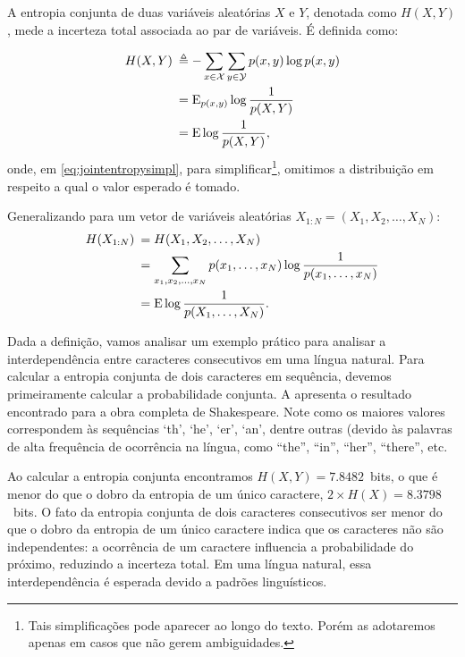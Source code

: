 A entropia conjunta de duas variáveis aleatórias $X$ e $Y$, denotada como $H(X,Y)$, 
mede a incerteza total associada ao par de variáveis. É definida como:
\begin{definition}
\begin{subequations}\label{eq:jointentropy}
\begin{align}    
H(X,Y) \: &\triangleq - \sum_{x \in \mathcal{X}} \sum_{y \in \mathcal{Y}} p(x,y) \log p(x,y) \\
	  &= \E_{p(x,y)} \log \frac{1}{p(X,Y)} \\
	  &= \E \log \frac{1}{p(X,Y)},\label{eq:jointentropysimpl}
\end{align}
\end{subequations}
onde, em \ref{eq:jointentropysimpl}, para simplificar\footnote{Tais simplificações pode
aparecer ao longo do texto. Porém as adotaremos apenas em casos que não gerem ambiguidades.}, 
omitimos a distribuição em respeito
a qual o valor esperado é tomado.
\end{definition}

Generalizando para um vetor de variáveis aleatórias $X_{1:N} = (X_1, X_2, \ldots, X_N)$:
\begin{subequations}\label{eq:entropiavetor}
\begin{align}
H(X_{1:N}) \: &= H(X_1, X_2, \ldots, X_N) \\
     &= \sum_{x_1, x_2, \ldots , x_N} p(x_1, \ldots, x_N) \log \frac{1}{p(x_1, \ldots, x_N)} \\
     &= \mathrm{E} \log \frac{1}{p(X_1, \ldots, X_N)} .
\end{align}
\end{subequations}

Dada a definição, vamos analisar um exemplo prático para analisar a
interdependência entre caracteres consecutivos em uma língua natural. Para
calcular a entropia conjunta de dois caracteres em sequência, devemos
primeiramente calcular a probabilidade conjunta. A
 apresenta o resultado encontrado para a
obra completa de Shakespeare. Note como os maiores valores correspondem às
sequências `th', `he', `er', `an', dentre outras (devido às palavras de alta
frequência de ocorrência na língua, como ``the'', ``in'', ``her'', ``there'',
etc.

Ao calcular a entropia conjunta encontramos $H(X,Y) = 7.8482$~bits, o que é
menor do que o dobro da entropia de um único caractere, $2 \times H(X) = 8.3798$~bits. 
O fato da entropia conjunta de dois caracteres consecutivos ser
menor do que o dobro da entropia de um único caractere indica que os caracteres
não são independentes: a ocorrência de um caractere influencia a probabilidade
do próximo, reduzindo a incerteza total. Em uma língua natural, essa
interdependência é esperada devido a padrões linguísticos.

